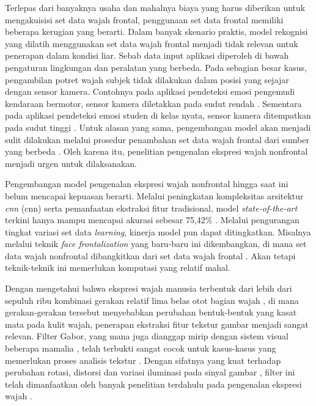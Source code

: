 Terlepas dari banyaknya usaha dan mahalnya biaya yang harus diberikan untuk mengakuisisi set data wajah frontal, penggunaan set data frontal memiliki beberapa kerugian yang berarti. Dalam banyak skenario praktis, model rekognisi yang dilatih menggunakan set data wajah frontal menjadi tidak relevan untuk penerapan dalam kondisi liar. Sebab data input aplikasi diperoleh di bawah pengaturan lingkungan dan peralatan yang berbeda. Pada sebagian besar kasus, pengambilan potret wajah subjek tidak dilakukan dalam posisi yang sejajar dengan sensor kamera. Contohnya pada aplikasi pendeteksi emosi pengemudi kendaraan bermotor, sensor kamera diletakkan pada sudut rendah . Sementara pada aplikasi pendeteksi emosi studen di kelas nyata, sensor kamera ditempatkan pada sudut tinggi . Untuk alasan yang sama, pengembangan model akan menjadi sulit dilakukan melalui prosedur penambahan set data wajah frontal dari sumber yang berbeda . Oleh karena itu, penelitian pengenalan ekspresi wajah nonfrontal menjadi urgen untuk dilaksanakan.

Pengembangan model pengenalan ekspresi wajah nonfrontal hingga saat ini belum mencapai kepuasan berarti. Melalui peningkatan kompleksitas arsitektur \textit{\acrlong{cnn}} (\acrshort{cnn})  serta pemanfaatan ekstraksi fitur tradisional, model \textit{state-of-the-art} terkini hanya mampu mencapai akurasi sebesar 75,42\% . Melalui pengurangan tingkat variasi set data \textit{learning}, kinerja model pun dapat ditingkatkan. Misalnya melalui teknik \textit{face frontalization} yang baru-baru ini dikembangkan, di mana set data wajah nonfrontal dibangkitkan dari set data wajah frontal . Akan tetapi teknik-teknik ini memerlukan komputasi yang relatif mahal.

Dengan mengetahui bahwa ekspresi wajah manusia terbentuk dari lebih dari sepuluh ribu kombinasi gerakan relatif lima belas otot bagian wajah , di mana gerakan-gerakan tersebut menyebabkan perubahan bentuk-bentuk yang kasat mata pada kulit wajah, penerapan ekstraksi fitur tekstur gambar menjadi sangat relevan. Filter Gabor, yang mana juga dianggap mirip dengan sistem visual beberapa mamalia , telah terbukti sangat cocok untuk kasus-kasus yang memerlukan proses analisis tekstur . Dengan sifatnya yang kuat terhadap perubahan rotasi, distorsi dan variasi iluminasi pada sinyal gambar , filter ini telah dimanfaatkan oleh banyak penelitian terdahulu pada pengenalan ekspresi wajah .

